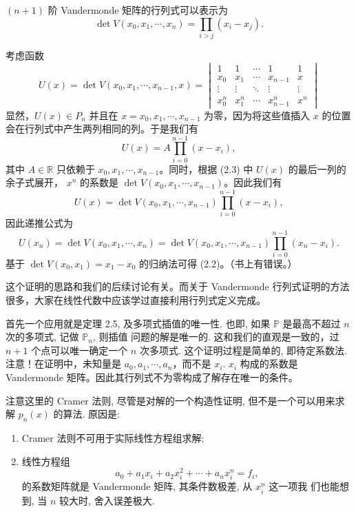 \documentclass[a4paper]{ctexart}
\begin{document}
 $(n + 1)$ 阶 Vandermonde 矩阵的行列式可以表示为
\[
\det V (x_0 , x_1 , \cdots , x_n ) = \prod_{i>j} (x_i - x_j). \tag{2.2}
\]

 考虑函数
\[
U (x) = \det V (x_0, x_1, \cdots , x_{n-1} , x) = \begin{vmatrix}
 1 & 1 & \cdots & 1 & 1 \\
 x_0 & x_1 & \cdots & x_{n-1} & x \\
 \vdots & \vdots & \ddots & \vdots & \vdots \\
 x_0^n & x_1^n & \cdots & x_{n-1}^n & x^n
\end{vmatrix} \tag{2.3}
\]
显然，$U (x) \in P_n$ 并且在 $x = x_0 , x_1 , \cdots , x_{n-1}$ 为零，因为将这些值插入 $x$ 的位置会在行列式中产生两列相同的列。于是我们有
\[
U (x) = A \prod_{i=0}^{n-1} (x - x_i),
\]
其中 $A \in \mathbb{R}$ 只依赖于 $x_0 , x_1 , \cdots , x_{n-1}$。同时，根据 (2.3) 中 $U (x)$ 的最后一列的余子式展开，
$x^n$ 的系数是 $\det V (x_0 , x_1 , \cdots , x_{n-1})$。因此我们有
\[
U (x) = \det V (x_0, x_1 , \cdots , x_{n-1}) \prod_{i=0}^{n-1} (x - x_i),
\]
因此递推公式为
\[
U(x_n) = \det V (x_0 , x_1 , \cdots , x_n) = \det V (x_0 , x_1 , \cdots , x_{n-1}) \prod_{i=0}^{n-1} (x_n - x_i).
\]
基于 $\det V(x_0, x_1) = x_1 - x_0$ 的归纳法可得 (2.2)。（书上有错误。）

这个证明的思路和我们的后续讨论有关。而关于 Vandermonde 行列式证明的方法很多，大家在线性代数中应该学过直接利用行列式定义完成。


首先一个应用就是定理 2.5, 及多项式插值的唯一性. 也即, 如果
$\mathbb{P}$ 是最高不超过 $n$ 次的多项式, 记做 $\mathbb{P}_n$, 则插值
问题的解是唯一的. 这和我们的直观是一致的，过 $n + 1$ 个点可以唯一确定一个 $n$ 次多项式.
这个证明过程是简单的, 即待定系数法. 注意！在证明中，未知量是 $a_0, a_1, \cdots, a_n$，而不是 $x_i$.
$x_i$ 构成的系数是 Vandermonde 矩阵。因此其行列式不为零构成了解存在唯一的条件。

注意这里的 Cramer 法则, 尽管是对解的一个构造性证明, 但不是一个可以用来求解 $p_n(x)$ 的算法. 
原因是:
\begin{enumerate}
\item Cramer 法则不可用于实际线性方程组求解;
\item 线性方程组
  $$
  a_0 + a_1 x_i + a_2 x_i^2 + \cdots + a_n x_i^n = f_i,
  $$
  的系数矩阵就是 Vandermonde 矩阵, 其条件数极差, 从 $x_i^n$ 这一项我
  们也能想到, 当 $n$ 较大时, 舍入误差极大. 
\end{enumerate}
\end{document}
